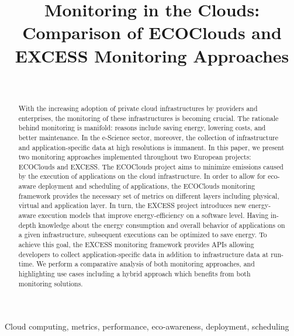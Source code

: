 \documentclass[10pt,letterpaper]{IEEEtran}
\begin{document}
\title{Monitoring in the Clouds: Comparison of ECOClouds and EXCESS Monitoring Approaches}

\author{ \\
}

\maketitle

\newcommand{\ECO}{ECOClouds\xspace}
\newcommand{\EXCESS}{EXCESS\xspace}

\begin{abstract}
With the increasing adoption of private cloud infrastructures by providers and enterprises, the monitoring of
these infrastructures is becoming crucial. The rationale behind monitoring is manifold: reasons include saving energy,
lowering costs, and better maintenance. In the e-Science sector, moreover, the collection of infrastructure and
application-specific data at high resolutions is immanent. In this paper, we present two monitoring approaches
implemented throughout two European projects: \ECO and \EXCESS. The \ECO project aims to minimize 
emissions caused by the execution of applications on the cloud infrastructure. In order to allow for eco-aware
deployment and scheduling of applications,
the \ECO monitoring framework provides the necessary set of metrics on different layers including physical,
virtual and application layer. In turn, the \EXCESS project introduces new energy-aware execution models
that improve energy-efficiency on a software level. Having in-depth knowledge
about the energy consumption and overall behavior of applications on a given infrastructure, subsequent executions
can be optimized to save energy. To achieve this goal, the \EXCESS monitoring framework provides APIs allowing
developers to collect application-specific data in addition to infrastructure data at run-time.
We perform a comparative analysis of both monitoring approaches, and highlighting use cases including
a hybrid approach which benefits from both monitoring solutions.
\end{abstract}

\begin{IEEEkeywords}
Cloud computing, metrics, performance, eco-awareness, deployment, scheduling
\end{IEEEkeywords}
\end{document}
